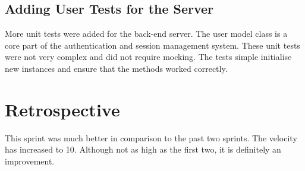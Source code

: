 \subsection{Adding User Tests for the Server}
More unit tests were added for the back-end server. The user model class is a core part of the authentication and session management system. These unit tests were not very complex and did not require mocking. The tests simple initialise new instances and ensure that the methods worked correctly.

\section{Retrospective}
This sprint was much better in comparison to the past two sprints. The velocity has increased to 10. Although not as high as the first two, it is definitely an improvement.
